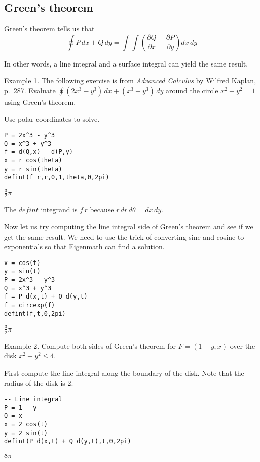 
\subsection{Green's theorem}
Green's theorem tells us that
$$\oint P\,dx+Q\,dy=\int\!\!\!\int
\left(\frac{\partial Q}{\partial x}-\frac{\partial P}{\partial y}\right)
dx\,dy$$

\noindent
In other words, a line integral and a surface integral can yield
the same result.

\bigskip
\noindent
Example 1.
The following exercise is from {\it Advanced Calculus}
by Wilfred Kaplan, p.~287.
Evaluate $\oint (2x^3-y^3)\,dx+(x^3+y^3)\,dy$ around the circle
$x^2+y^2=1$ using Green's theorem.

\bigskip
\noindent
Use polar coordinates to solve.

{\color{blue}
\begin{verbatim}
P = 2x^3 - y^3
Q = x^3 + y^3
f = d(Q,x) - d(P,y)
x = r cos(theta)
y = r sin(theta)
defint(f r,r,0,1,theta,0,2pi)
\end{verbatim}
}

\noindent
$\displaystyle \tfrac{3}{2}\pi$

\bigskip
\noindent
The $defint$ integrand is $f\,r$ because $r\,dr\,d\theta=dx\,dy$.

\bigskip
\noindent
Now let us try computing the line integral side of Green's theorem
and see if we get the same result.
We need to use the trick of converting sine and cosine to exponentials
so that Eigenmath can find a solution.

{\color{blue}
\begin{verbatim}
x = cos(t)
y = sin(t)
P = 2x^3 - y^3
Q = x^3 + y^3
f = P d(x,t) + Q d(y,t)
f = circexp(f)
defint(f,t,0,2pi)
\end{verbatim}
}

\noindent
$\displaystyle \tfrac{3}{2}\pi$

\bigskip
\noindent
Example 2.
Compute both sides of Green's theorem for
$F=(1-y,x)$ over the disk $x^2+y^2\le4$.

\bigskip
\noindent
First compute the line integral along the boundary of the disk.
Note that the radius of the disk is 2.

{\color{blue}
\begin{verbatim}
-- Line integral
P = 1 - y
Q = x
x = 2 cos(t)
y = 2 sin(t)
defint(P d(x,t) + Q d(y,t),t,0,2pi)
\end{verbatim}
}

\noindent
$\displaystyle 8\pi$

